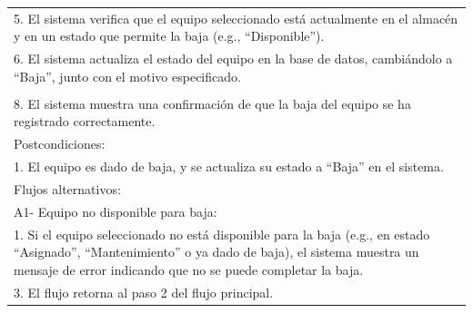 \documentclass[stu, 12pt, letterpaper, donotrepeattitle, floatsintext, natbib]{apa7}
\begin{document}
\begin{longtable}{@{} p{16.5cm} @{}}
    5. El sistema verifica que el equipo seleccionado está actualmente en el almacén y en un estado que permite la baja (e.g., ``Disponible'').                                                                                       \\
    6. El sistema actualiza el estado del equipo en la base de datos, cambiándolo a ``Baja'', junto con el motivo especificado.                                                                                                       \\                                                                                                                     \\
    8. El sistema muestra una confirmación de que la baja del equipo se ha registrado correctamente.                                                                                                                                  \\ \midrule
    Postcondiciones:                                                                                                                                                                                                                  \\
    1. El equipo es dado de baja, y se actualiza su estado a ``Baja'' en el sistema.                                                                                                                                                  \\ \midrule
    Flujos alternativos:                                                                                                                                                                                                              \\
    A1- Equipo no disponible para baja:                                                                                                                                                                                               \\
    \hspace{1cm}1. Si el equipo seleccionado no está disponible para la baja (e.g., en estado ``Asignado'', ``Mantenimiento'' o ya dado de baja), el sistema muestra un mensaje de error indicando que no se puede completar la baja. \\
    \hspace{1cm}3. El flujo retorna al paso 2 del flujo principal.                                                                                                                                                                    \\

\end{longtable}
\end{document}
